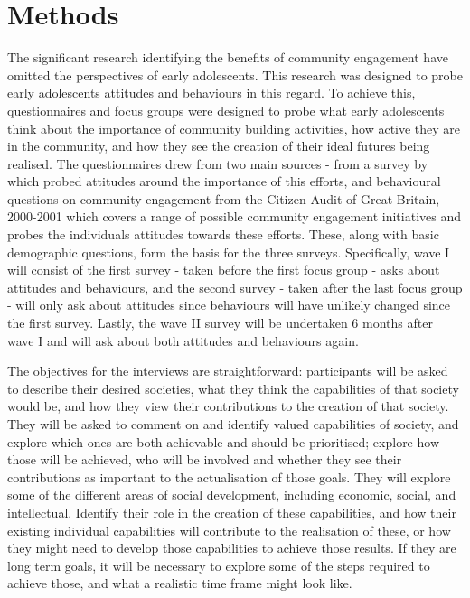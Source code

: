 \chapter{Methods} %


The significant research identifying the benefits of community engagement have omitted the perspectives of early adolescents. This research was designed to probe early adolescents attitudes and behaviours in this regard. To achieve this, questionnaires and focus groups were designed to probe what early adolescents think about the importance of community building activities, how active they are in the community, and how they see the creation of their ideal futures being realised. The questionnaires drew from two main sources - from a survey by \citet{Lakin2006} which probed attitudes around the importance of this efforts, and behavioural questions on community engagement from the Citizen Audit of Great Britain, 2000-2001 which covers a range of possible community engagement initiatives and probes the individuals attitudes towards these efforts. These, along with basic demographic questions, form the basis for the three surveys. Specifically, wave I will consist of the first survey - taken before the first focus group - asks about attitudes and behaviours, and the second survey - taken after the last focus group - will only ask about attitudes since behaviours will have unlikely changed since the first survey. Lastly, the wave II survey will be undertaken 6 months after wave I and will ask about both attitudes and behaviours again. 




The objectives for the interviews are straightforward: participants will be asked to describe their desired societies, what they think the capabilities of that society would be, and how they view their contributions to the creation of that society. They will be asked to comment on and identify valued capabilities of society, and explore which ones are both achievable and should be prioritised; explore how those will be achieved, who will be involved and whether they see their contributions as important to the actualisation of those goals. They will explore some of the different areas of social development, including economic, social, and intellectual. Identify their role in the creation of these capabilities, and how their existing individual capabilities will contribute to the realisation of these, or how they might need to develop those capabilities to achieve those results. If they are long term goals, it will be necessary to explore some of the steps required to achieve those, and what a realistic time frame might look like.



